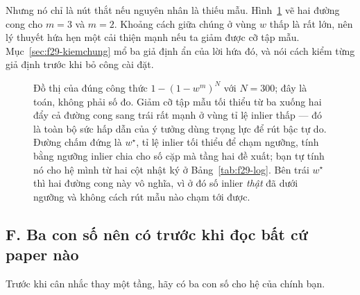 \documentclass[../../deep_learning.tex]{subfiles}
\begin{document}
Nhưng nó chỉ là nút thắt nếu nguyên nhân là thiếu mẫu. Hình~\ref{fig:f29-ransac} vẽ hai đường cong cho \(m=3\) và \(m=2\). Khoảng cách giữa chúng ở vùng \(w\) thấp là rất lớn, nên lý thuyết hứa hẹn một cải thiện mạnh nếu ta giảm được cỡ tập mẫu. Mục~\ref{sec:f29-kiemchung} mổ ba giả định ẩn của lời hứa đó, và nói cách kiểm từng giả định trước khi bỏ công cài đặt.

\begin{figure}[H]\centering
{}
\caption{Đồ thị của đúng công thức \(1-(1-w^m)^N\) với \(N=300\); đây là toán, không phải số đo. Giảm cỡ tập mẫu tối thiểu từ ba xuống hai đẩy cả đường cong sang trái rất mạnh ở vùng tỉ lệ inlier thấp --- đó là toàn bộ sức hấp dẫn của ý tưởng dùng trọng lực để rút bậc tự do. Đường chấm đứng là \(w^\star\), tỉ lệ inlier tối thiểu để chạm ngưỡng, tính bằng ngưỡng inlier chia cho số cặp mà tầng hai đề xuất; bạn tự tính nó cho hệ mình từ hai cột nhật ký ở Bảng~\ref{tab:f29-log}. Bên trái \(w^\star\) thì hai đường cong này vô nghĩa, vì ở đó số inlier \emph{thật} đã dưới ngưỡng và không cách rút mẫu nào chạm tới được.}
\label{fig:f29-ransac}
\end{figure}

\subsection{F. Ba con số nên có trước khi đọc bất cứ paper nào}
Trước khi cân nhắc thay một tầng, hãy có ba con số cho hệ của chính bạn.
\end{document}
